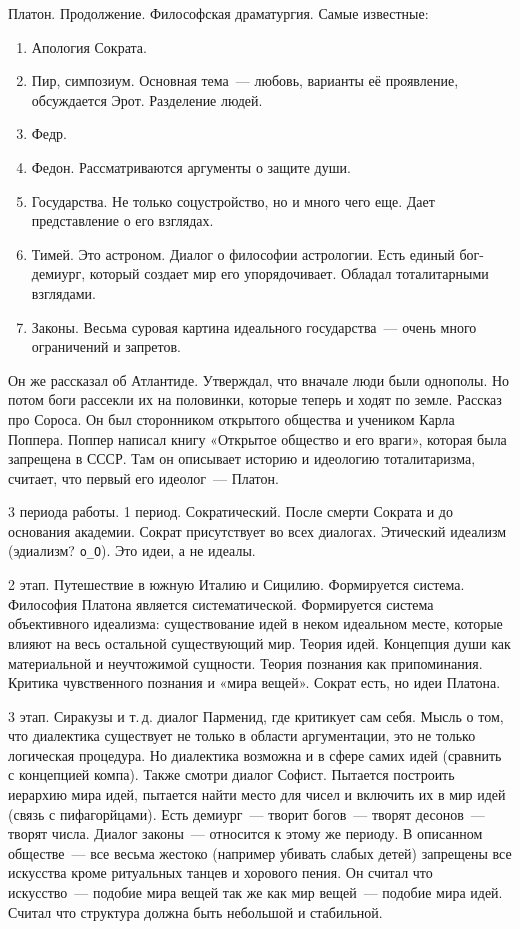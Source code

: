 Платон. Продолжение. 
Философская драматургия. 
Самые известные:

\begin{enumerate} 
	\item Апология Сократа. 
	\item Пир, симпозиум. Основная тема~--- любовь, варианты её проявление, обсуждается Эрот. Разделение людей. 
	\item Федр. 
	\item Федон. Рассматриваются аргументы о защите души. 
	\item Государства. Не только соцустройство, но и много чего еще. Дает представление о его взглядах. 
	\item Тимей. Это астроном. Диалог о философии астрологии. Есть единый бог-демиург, который создает мир его упорядочивает. Обладал тоталитарными взглядами. 
	\item Законы. Весьма суровая картина идеального государства~--- очень много ограничений и запретов.
\end{enumerate}

Он же рассказал об Атлантиде. 
Утверждал, что вначале люди были однополы. Но потом боги рассекли их на половинки, которые теперь и ходят по земле. 
Рассказ про Сороса. Он был сторонником открытого общества и учеником Карла Поппера. 
Поппер написал книгу «Открытое общество и его враги», которая была запрещена в СССР. 
Там он описывает историю и идеологию тоталитаризма, считает, что первый его идеолог~--- Платон. 

3 периода работы. 
1 период. Сократический. После смерти Сократа и до основания академии. Сократ присутствует во всех диалогах. Этический идеализм (эдиализм? \texttt{o\_O}). Это идеи, а не идеалы. 

2 этап. Путешествие в южную Италию и Сицилию. Формируется система. Философия Платона является систематической. 
Формируется система объективного идеализма: существование идей в неком идеальном месте, которые влияют на весь остальной существующий мир. Теория идей. Концепция души как материальной и неучтожимой сущности. 
Теория познания как припоминания. Критика чувственного познания и «мира вещей». Сократ есть, но идеи Платона. 

3 этап. Сиракузы и т.\,д. диалог Парменид, где критикует сам себя. Мысль о том, что диалектика существует не только в области аргументации, это не только логическая процедура. 
Но диалектика возможна и в сфере самих идей (сравнить с концепцией компа). Также смотри диалог Софист. Пытается построить иерархию мира идей, пытается найти место для чисел и включить их в мир идей (связь с пифагорйцами). 
Есть демиург~--- творит богов~--- творят десонов~--- творят числа. Диалог законы~--- относится к этому же периоду. 
В описанном обществе~--- все весьма жестоко (например убивать слабых детей) запрещены все искусства кроме ритуальных танцев и хорового пения. 
Он считал что искусство~--- подобие мира вещей так же как мир вещей~--- подобие мира идей. Считал что структура должна быть небольшой и стабильной. 

